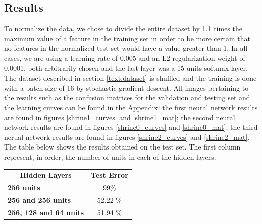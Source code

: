 \begin{multicols}{2}
\subsection{Results}
To normalize the data, we chose to divide the entire dataset by 1.1 times the maximum value of a feature in the training set in order to be more certain that no features in the normalized test set would have a value greater than 1. In all cases, we are using a learning rate of 0.005 and an L2 regularization weight of 0.0001, both arbitrarily chosen and the last layer was a 15 units softmax layer. The dataset described in section \ref{text:dataset} is shuffled and the training is done with a batch size of 16 by stochastic gradient descent. All images pertaining to the results such as the confusion matrices for the validation and testing set and the learning curves can be found in the Appendix: the first neural network results are found in figures \ref{shrine1_curves} and \ref{shrine1_mat}; the second neural network results are found in figures \ref{shrine0_curves} and \ref{shrine0_mat}; the third nerual network results are found in figures \ref{shrine2_curves} and \ref{shrine2_mat}. The table below shows the results obtained on the test set. The first column represent, in order, the number of units in each of the hidden layers. 

\begin{tabular}{lc}
\multicolumn{1}{c}{\textbf{Hidden Layers}} & \textbf{Test Error} \\
\textbf{256 units}                         &         99\%            \\
\textbf{256 and 256 units}                 &   52.22 \%                \\
\textbf{256, 128 and 64 units}             &   51.94 \%                 
\end{tabular}


\end{multicols}
